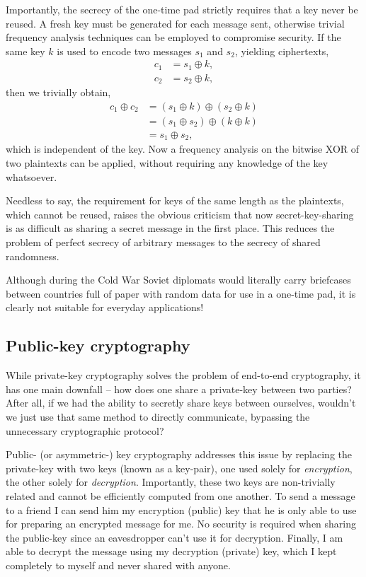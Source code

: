 Importantly, the secrecy of the one-time pad strictly requires that a key never be reused. A fresh key must be generated for each message sent, otherwise trivial frequency analysis techniques can be employed to compromise security. If the same key $k$ is used to encode two messages $s_1$ and $s_2$, yielding ciphertexts,
\begin{align}
c_1&=s_1\oplus k,\nonumber\\
c_2&=s_2\oplus k,
\end{align}
then we trivially obtain,
\begin{align}
c_1 \oplus c_2 &= (s_1 \oplus k) \oplus (s_2 \oplus k) \nonumber \\
&= (s_1 \oplus s_2) \oplus (k \oplus k) \nonumber \\
&= s_1 \oplus s_2,
\end{align}
which is independent of the key. Now a frequency analysis on the bitwise XOR of two plaintexts can be applied, without requiring any knowledge of the key whatsoever.

Needless to say, the requirement for keys of the same length as the plaintexts, which cannot be reused, raises the obvious criticism that now secret-key-sharing is as difficult as sharing a secret message in the first place. This reduces the problem of perfect secrecy of arbitrary messages to the secrecy of shared randomness. 

Although during the Cold War Soviet diplomats would literally carry briefcases between countries full of paper with random data for use in a one-time pad, it is clearly not suitable for everyday applications!

%
%

\subsection{Public-key cryptography}

While private-key cryptography solves the problem of end-to-end cryptography, it has one main downfall -- how does one share a private-key between two parties? After all, if we had the ability to secretly share keys between ourselves, wouldn't we just use that same method to directly communicate, bypassing the unnecessary cryptographic protocol?

Public- (or asymmetric-) key cryptography addresses this issue by replacing the private-key with two keys (known as a key-pair), one used solely for \textit{encryption}, the other solely for \textit{decryption}. Importantly, these two keys are non-trivially related and cannot be efficiently computed from one another. To send a message to a friend I can send him my encryption (public) key that he is only able to use for preparing an encrypted message for me. No security is required when sharing the public-key since an eavesdropper can't use it for decryption. Finally, I am able to decrypt the message using my decryption (private) key, which I kept completely to myself and never shared with anyone.

